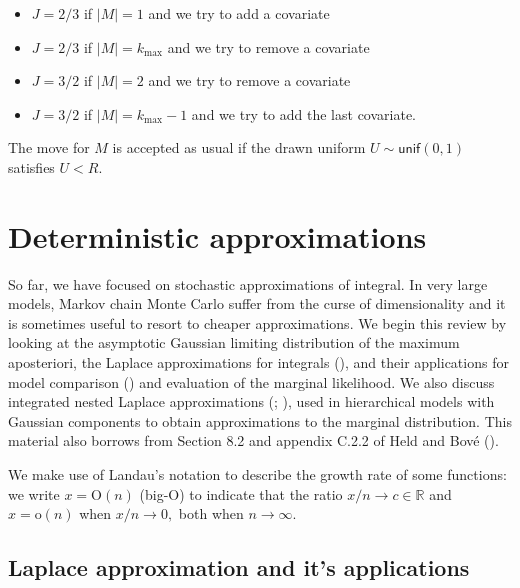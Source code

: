 \documentclass[
  11pt,
  letterpaper,
]{scrbook}
\providecommand{\tightlist}{%
  \setlength{\itemsep}{0pt}\setlength{\parskip}{0pt}}
\theoremstyle{definition}
\theoremstyle{plain}
\theoremstyle{plain}
\theoremstyle{plain}
\theoremstyle{definition}
\theoremstyle{definition}
\theoremstyle{plain}
\theoremstyle{plain}
\theoremstyle{remark}
\begin{document}
\begin{itemize}
\tightlist
\item
  \(J=2/3\) if \(|M|=1\) and we try to add a covariate
\item
  \(J=2/3\) if \(|M|=k_{\max}\) and we try to remove a covariate
\item
  \(J=3/2\) if \(|M|=2\) and we try to remove a covariate
\item
  \(J=3/2\) if \(|M|=k_{\max}-1\) and we try to add the last covariate.
\end{itemize}

The move for \(M\) is accepted as usual if the drawn uniform
\(U \sim \mathsf{unif}(0,1)\) satisfies \(U<R.\)


\chapter{Deterministic
approximations}\label{deterministic-approximations}

So far, we have focused on stochastic approximations of integral. In
very large models, Markov chain Monte Carlo suffer from the curse of
dimensionality and it is sometimes useful to resort to cheaper
approximations. We begin this review by looking at the asymptotic
Gaussian limiting distribution of the maximum aposteriori, the Laplace
approximations for integrals (), and their applications for model comparison
() and evaluation of the
marginal likelihood. We also discuss integrated nested Laplace
approximations (;
), used in hierarchical models with
Gaussian components to obtain approximations to the marginal
distribution. This material also borrows from Section 8.2 and appendix
C.2.2 of Held and Bové ().

We make use of Landau's notation to describe the growth rate of some
functions: we write \(x = \mathrm{O}(n)\) (big-O) to indicate that the
ratio \(x/n \to c \in \mathbb{R}\) and \(x =\mathrm{o}(n)\) when
\(x/n \to 0,\) both when \(n \to \infty.\)

\section{Laplace approximation and it's
applications}\label{laplace-approximation-and-its-applications}
\end{document}
